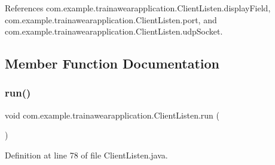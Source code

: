References com.\+example.\+trainawearapplication.\+Client\+Listen.\+display\+Field, com.\+example.\+trainawearapplication.\+Client\+Listen.\+port, and com.\+example.\+trainawearapplication.\+Client\+Listen.\+udp\+Socket.



\subsection{Member Function Documentation}
\mbox{\label{classcom_1_1example_1_1trainawearapplication_1_1_client_listen_adcb69d9825d6d9e182905cf9b4aa4d7d}} 
\subsubsection{\texorpdfstring{run()}{run()}}
{\footnotesize\ttfamily void com.\+example.\+trainawearapplication.\+Client\+Listen.\+run (\begin{DoxyParamCaption}{ }\end{DoxyParamCaption})}



Definition at line 78 of file Client\+Listen.\+java.


